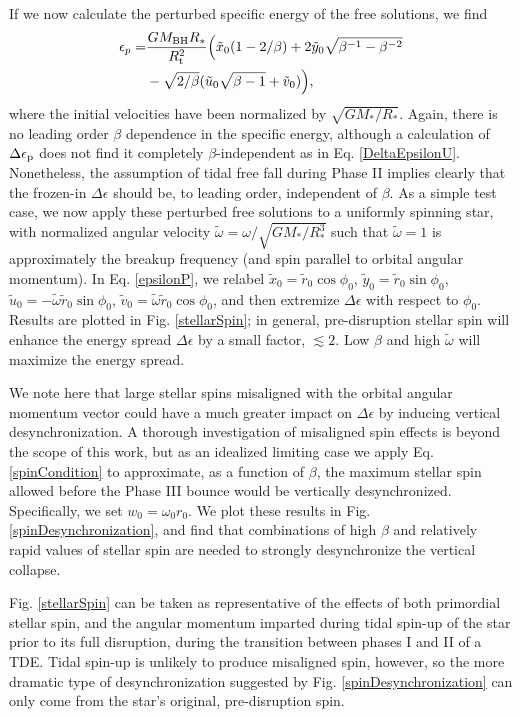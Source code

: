\documentclass[useAMS, twocolumn, usenatbib]{mn2e}
\begin{document}
If we now calculate the perturbed specific energy of the free solutions, we find
\begin{align}
\epsilon_p=&\frac{GM_{\rm BH}R_*}{R_{\rm t}^2} \Big(\tilde{x}_0(1-2/\beta)+2\tilde{y}_0\sqrt{\beta^{-1}-\beta^{-2}}\label{epsilonP}  \\
&-\sqrt{2/\beta}(\tilde{u}_0\sqrt{\beta-1}+\tilde{v}_0)\Big ),\notag  
\end{align}
where the initial velocities have been normalized by $\sqrt{GM_*/R_*}$.  Again, there is no leading order $\beta$ dependence in the specific energy, although a calculation of $\Delta\epsilon_{\rm p}$ does not find it completely $\beta$-independent as in Eq. \ref{DeltaEpsilonU}.  Nonetheless, the assumption of tidal free fall during Phase II implies clearly that the frozen-in $\Delta \epsilon$ should be, to leading order, independent of $\beta$.  As a simple test case, we now apply these perturbed free solutions to a uniformly spinning star, with normalized angular velocity $\tilde{\omega}=\omega/\sqrt{GM_*/R_*^3}$ such that $\tilde{\omega}=1$ is approximately the breakup frequency (and spin parallel to orbital angular momentum).  In Eq. \ref{epsilonP}, we relabel $\tilde{x}_0=\tilde{r}_0 \cos\phi_0$, $\tilde{y}_0=\tilde{r}_0 \sin\phi_0$, $\tilde{u}_0=-\tilde{\omega} \tilde{r}_0 \sin\phi_0$,  $\tilde{v}_0=\tilde{\omega} \tilde{r}_0 \cos\phi_0$, and then extremize $\Delta \epsilon$ with respect to $\phi_0$.  Results are plotted in Fig. \ref{stellarSpin}; in general, pre-disruption stellar spin will enhance the energy spread $\Delta \epsilon$ by a small factor, $\lesssim 2$.  Low $\beta$ and high $\tilde{\omega}$ will maximize the energy spread.  

We note here that large stellar spins misaligned with the orbital angular momentum vector could have a much greater impact on $\Delta\epsilon$ by inducing vertical desynchronization.  A thorough investigation of misaligned spin effects is beyond the scope of this work, but as an idealized limiting case we apply Eq. \ref{spinCondition} to approximate, as a function of $\beta$, the maximum stellar spin allowed before the Phase III bounce would be vertically desynchronized.  Specifically, we set $w_0=\omega_0r_0$.  We plot these results in Fig. \ref{spinDesynchronization}, and find that combinations of high $\beta$ and relatively rapid values of stellar spin are needed to strongly desynchronize the vertical collapse.

Fig. \ref{stellarSpin} can be taken as representative of the effects of both primordial stellar spin, and the angular momentum imparted during tidal spin-up of the star prior to its full disruption, during the transition between phases I and II of a TDE.  Tidal spin-up is unlikely to produce misaligned spin, however, so the more dramatic type of desynchronization suggested by Fig. \ref{spinDesynchronization} can only come from the star's original, pre-disruption spin.
\end{document}
